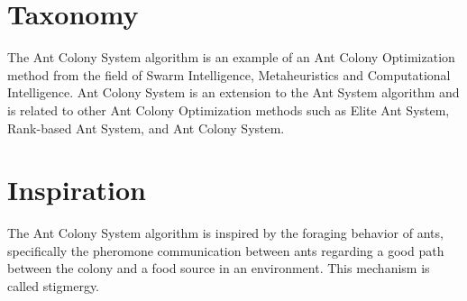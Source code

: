 \documentclass[a4paper, 11pt]{article}
\begin{document}
\section{Taxonomy}
\label{sec:taxonomy}
The Ant Colony System algorithm is an example of an Ant Colony Optimization method from the field of Swarm Intelligence, Metaheuristics and Computational Intelligence.
Ant Colony System is an extension to the Ant System algorithm and is related to other Ant Colony Optimization methods such as Elite Ant System, Rank-based Ant System, and Ant Colony System.

\section{Inspiration}
\label{sec:inspiration}
The Ant Colony System algorithm is inspired by the foraging behavior of ants, specifically the pheromone communication between ants regarding a good path between the colony and a food source in an environment. This mechanism is called stigmergy.

\end{document}
